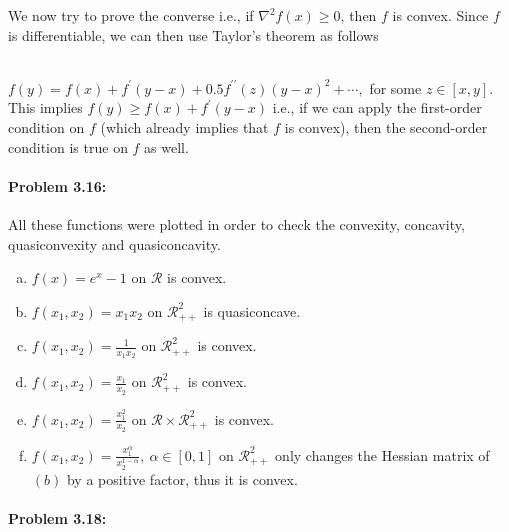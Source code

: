 \documentclass[12pt] {article}
\begin{document}
We now try to prove the converse i.e., if $\nabla^{2}f(x)\geq 0$, then $f$ is convex. Since $f$ is differentiable, we can then use Taylor's theorem as follows
\\\

$f(y) = f(x) + f^{\prime}(y-x) + 0.5f^{\prime \prime}(z)(y-x)^{2} + \cdots,$ for some  $z \in [x,y]$. This implies $f(y) \geq f(x) + f^{\prime}(y-x)$ i.e., if we can apply the first-order condition on $f$ (which already implies that $f$ is convex), then the second-order condition is true on $f$ as well. 

\paragraph{Problem 3.16:} 
All these functions were plotted in order to check the convexity, concavity, quasiconvexity and quasiconcavity. 
\begin{enumerate}[(a)]
\item $f(x) = e^{x}-1$ on $\mathcal{R}$ is convex. 
\item $f(x_{1},x_{2}) = x_{1}x_{2}$ on $\mathcal{R}^{2}_{++}$ is quasiconcave.
\item $f(x_{1},x_{2}) = \frac{1}{x_{1}x_{2}}$ on $\mathcal{R}^{2}_{++}$ is convex.
\item $f(x_{1},x_{2}) = \frac{x_{1}}{x_{2}}$ on $\mathcal{R}^{2}_{++}$ is convex.
\item $f(x_{1},x_{2}) = \frac{x_{1}^{2}}{x_{2}}$ on $\mathcal{R} \times \mathcal{R}^{2}_{++}$ is convex. 
\item $f(x_{1},x_{2}) = \frac{x_{1}^{\alpha}}{x_{2}^{1-\alpha}},\ \alpha \in [0,1]$ on $\mathcal{R}^{2}_{++}$ only changes the Hessian matrix of $(b)$ by a positive factor, thus it is convex. 

\end{enumerate}

\paragraph{Problem 3.18:} 
\end{document}
